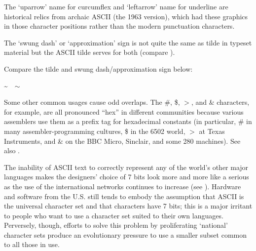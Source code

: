 The `uparrow' name for curcumflex and `leftarrow' name for underline are historical relics from archaic ASCII (the 1963 version), which had
these graphics in those character positions rather than the modern punctuation characters.

The `swung dash' or `approximation' sign is not quite the same as tilde in typeset material but the ASCII tilde serves for both (compare
).

\begin{new}
	Compare the tilde and swung dash/approximation sign below:
	\begin{center}
		\Huge
		\textasciitilde\ \ $\sim$
	\end{center}
\end{new}

Some other common usages cause odd overlaps. The \#, \$, $>$, and \& characters, for example, are all pronounced ``hex'' in different
communities because various assemblers use them as a prefix tag for hexadecimal constants (in particular, \# in many assembler-programming
cultures, \$ in the 6502 world, $>$ at Texas Instruments, and \& on the BBC Micro, Sinclair, and some 280 machines). See also
.

The inability of ASCII text to correctly represent any of the world's other major languages makes the designers' choice of 7 bits look more
and more like a serious  as the use of the international networks continues to increase (see ). Hardware and software from the U.S. still tends to embody the assumption that ASCII is the universal character set and that
characters have 7 bits; this is a major irritant to people who want to use a character set suited to their own languages. Perversely,
though, efforts to solve this problem by proliferating `national' character sets produce an evolutionary pressure to use a smaller subset
common to all those in use.

